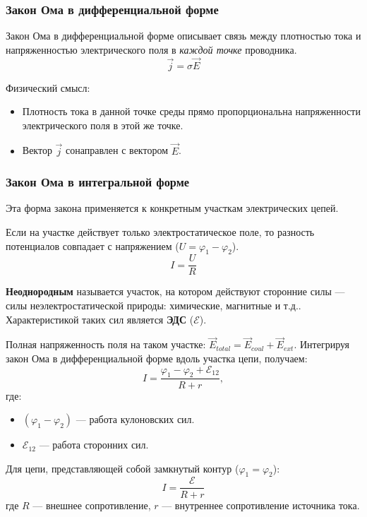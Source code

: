\subsubsection{Закон Ома в дифференциальной форме}

Закон Ома в дифференциальной форме описывает связь между плотностью тока и напряженностью электрического поля в \textit{каждой точке} проводника.
\[
    \vec{j} = \sigma \vec{E}
\]

Физический смысл:
\begin{itemize}
    \item Плотность тока в данной точке среды прямо пропорциональна напряженности электрического поля в этой же точке.
    \item Вектор $\vec{j}$ сонаправлен с вектором $\vec{E}$.
\end{itemize}

\subsubsection{Закон Ома в интегральной форме}

Эта форма закона применяется к конкретным участкам электрических цепей.

Если на участке действует только электростатическое поле, то разность потенциалов совпадает с напряжением ($U = \varphi_1 - \varphi_2$).
\[
    I = \frac{U}{R}
\]

\textbf{Неоднородным} называется участок, на котором действуют сторонние силы --- силы неэлектростатической природы: химические, магнитные и т.д.. Характеристикой таких сил является \textbf{ЭДС} ($\mathcal{E}$).

Полная напряженность поля на таком участке: $\vec{E}_{total} = \vec{E}_{coul} + \vec{E}_{ext}$.
Интегрируя закон Ома в дифференциальной форме вдоль участка цепи, получаем:
\[
    I = \frac{\varphi_1 - \varphi_2 + \mathcal{E}_{12}}{R + r},
\]
где:
\begin{itemize}
    \item $(\varphi_1 - \varphi_2)$ — работа кулоновских сил.
    \item $\mathcal{E}_{12}$ — работа сторонних сил.
\end{itemize}

Для цепи, представляющей собой замкнутый контур ($\varphi_1 = \varphi_2$):
\[
    I = \frac{\mathcal{E}}{R + r}
\]
где $R$ — внешнее сопротивление, $r$ — внутреннее сопротивление источника тока.

